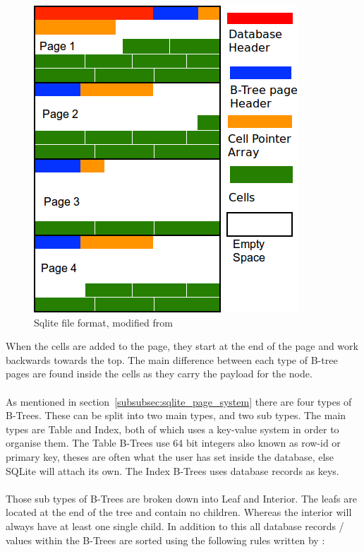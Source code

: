 \begin{figure}[H]
	\centering
	\includegraphics[scale=0.5]{images/sqlite_file_format.png}
	\caption{Sqlite file format, modified from \cite{sausagefactory}}
	\label{fig:sqlite_file_format}
\end{figure}

When the cells are added to the page, they start at the end of the page and work backwards towards the top. The main difference between each type of B-tree pages are found inside the cells as they carry the payload for the node. 
\\\\
As mentioned in section~\ref{subsubsec:sqlite_page_system} there are four types of B-Trees. These can be split into two main types, and two sub types. The main types are Table and Index, both of which uses a key-value system in order to organise them. The Table B-Trees use 64 bit integers also known as row-id or primary key, theses are often what the user has set inside the database, else SQLite will attach its own. The Index B-Trees uses database records as keys. 
\\\\
Those sub types of B-Trees are broken down into Leaf and Interior. The leafs are located at the end of the tree and contain no children. Whereas the interior will always have at least one single child. In addition to this all database records / values within the B-Trees are sorted using the following rules written by \cite{sqliteray}:

